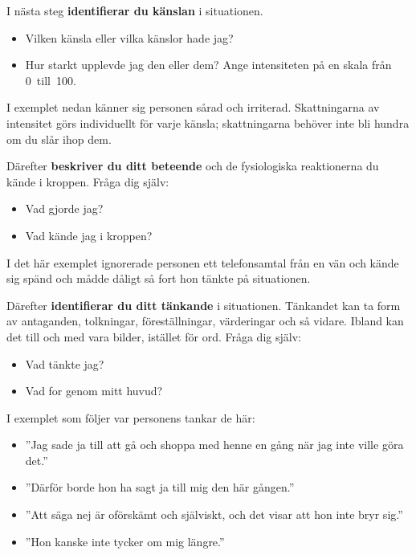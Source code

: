 \documentclass[swedish,a4paper]{book}
\begin{document}
I nästa steg \textbf{identifierar du känslan} i situationen.

{\raggedright

\begin{itemize}

\item Vilken känsla eller vilka känslor hade jag?

\item Hur starkt upplevde jag den eller dem? Ange intensiteten på en skala från 0~till~100.

\end{itemize}

} %

I exemplet nedan känner sig personen sårad och irriterad. Skattningarna av intensitet görs individuellt för varje känsla; skattningarna behöver inte bli hundra om du slår ihop dem.

Därefter \textbf{beskriver du ditt beteende} och de fysiologiska reaktionerna du kände i kroppen. Fråga dig själv:

\begin{itemize}

\item Vad gjorde jag?

\item Vad kände jag i kroppen?

\end{itemize}

I det här exemplet ignorerade personen ett telefonsamtal från en vän och kände sig spänd och mådde dåligt så fort hon tänkte på situationen.

Därefter \textbf{identifierar du ditt tänkande} i situationen. Tänkandet kan ta form av  antaganden, tolkningar, föreställningar, värderingar och så vidare. Ibland kan det till och med vara bilder, istället för ord. Fråga dig själv:

\begin{itemize}

\item Vad tänkte jag?

\item Vad for genom mitt huvud?

\end{itemize}

I exemplet som följer var personens tankar de här:

\begin{itemize}

\item ''Jag sade ja till att gå och shoppa med henne en gång när jag inte ville göra det.''

\item ''Därför borde hon ha sagt ja till mig den här gången.''

\item ''Att säga nej är oförskämt och själviskt, och det visar att hon inte bryr sig.''

\item ''Hon kanske inte tycker om mig längre.''

\end{itemize}
\end{document}
